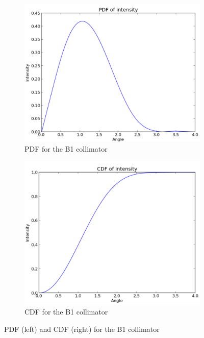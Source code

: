 \begin{figure}
    \centering
    
    \begin{subfigure}{0.5\textwidth}
        \centering
        \includegraphics[width=\textwidth]{Figures/B1_coll_pdf.png} %
        \caption{PDF for the B1 collimator}
    \end{subfigure}\hfill
    \begin{subfigure}{0.5\textwidth}
        \centering
        \includegraphics[width=\textwidth]{Figures/B1_coll_cdf.png} %
        \caption{CDF for the B1 collimator}
    \end{subfigure}
    \caption{PDF (left) and CDF (right) for the B1 collimator }
    \label{fig:PDF_CDF_coll_B1}
\end{figure}


